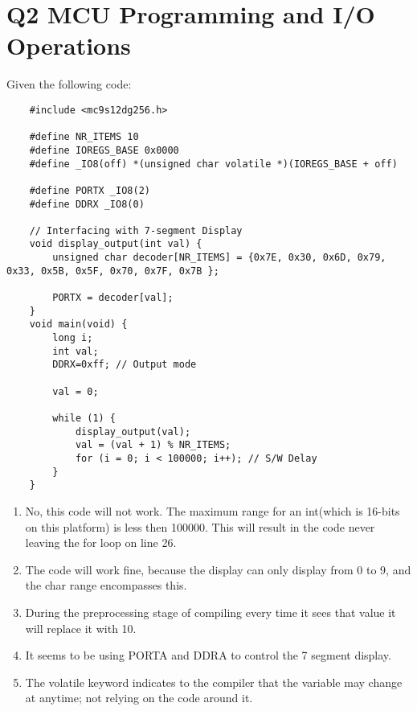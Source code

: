 \documentclass{article}
\begin{document}
	\section*{Q2 MCU Programming and I/O Operations}
	Given the following code:
	\begin{lstlisting}
	#include <mc9s12dg256.h>
	
	#define NR_ITEMS 10
	#define IOREGS_BASE 0x0000
	#define _IO8(off) *(unsigned char volatile *)(IOREGS_BASE + off)
	
	#define PORTX _IO8(2)
	#define DDRX _IO8(0)
	
	// Interfacing with 7-segment Display
	void display_output(int val) {
		unsigned char decoder[NR_ITEMS] = {0x7E, 0x30, 0x6D, 0x79, 0x33, 0x5B, 0x5F, 0x70, 0x7F, 0x7B };
	
		PORTX = decoder[val];
	}
	void main(void) {
		long i;
		int val;
		DDRX=0xff; // Output mode
		
		val = 0;
		
		while (1) {
			display_output(val);
			val = (val + 1) % NR_ITEMS;
			for (i = 0; i < 100000; i++); // S/W Delay
		}
	}
	\end{lstlisting}
	\begin{enumerate}
		\item No, this code will not work. The maximum range for an int(which is 16-bits on this platform) is less then 100000. This will result in the code never leaving the for loop on line 26.
		\item The code will work fine, because the display can only display from 0 to 9, and the char range encompasses this.
		\item During the preprocessing stage of compiling every time it sees that value it will replace it with 10.
		\item It seems to be using PORTA and DDRA to control the 7 segment display.
		\item The volatile keyword indicates to the compiler that the variable may change at anytime; not relying on the code around it.
	\end{enumerate}
\end{document}
